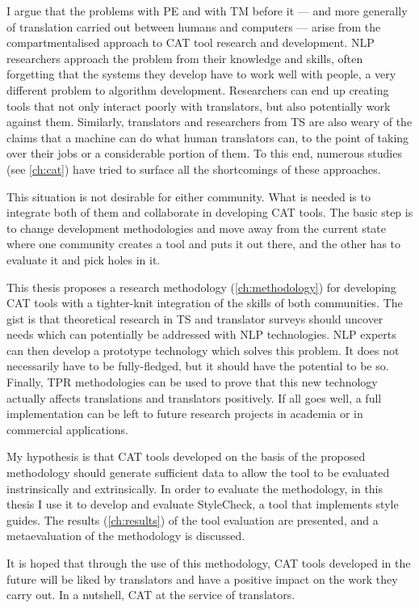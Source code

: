 I argue that the problems with \ac{PE} and with \ac{TM} before it --- and more generally of translation carried out between humans and computers --- arise from the compartmentalised approach to \ac{CAT} tool research and development. \ac{NLP} researchers approach the problem from their knowledge and skills, often forgetting that the systems they develop have to work well with people, a very different problem to algorithm development. Researchers can end up creating tools that not only interact poorly with translators, but also potentially work against them. Similarly, translators and researchers from \ac{TS} are also weary of the claims that a machine can do what human translators can, to the point of taking over their jobs or a considerable portion of them. To this end, numerous studies (see \autoref{ch:cat}) have tried to surface all the shortcomings of these approaches. 

This situation is not desirable for either community. What is needed is to integrate both of them and collaborate in developing \ac{CAT} tools. The basic step is to change development methodologies and move away from the current state where one community creates a tool and puts it out there, and the other has to evaluate it and pick holes in it.

This thesis proposes a research methodology (\autoref{ch:methodology}) for developing \ac{CAT} tools with a tighter-knit integration of the skills of both communities. The gist is that theoretical research in \ac{TS} and translator surveys should uncover needs which can potentially be addressed with \ac{NLP} technologies. \ac{NLP} experts can then develop a prototype technology which solves this problem. It does not necessarily have to be fully-fledged, but it should have the potential to be so. Finally, \ac{TPR} methodologies can be used to prove that this new technology actually affects translations and translators positively. If all goes well, a full implementation can be left to future research projects in academia or in commercial applications.

My hypothesis is that \ac{CAT} tools developed on the basis of the proposed methodology should generate sufficient data to allow the tool to be evaluated instrinsically and extrinsically. In order to evaluate the methodology, in this thesis I use it to develop and evaluate StyleCheck, a tool that implements style guides. The results (\autoref{ch:results}) of the tool evaluation are presented, and a metaevaluation of the methodology is discussed.

It is hoped that through the use of this methodology, \ac{CAT} tools developed in the future will be liked by translators and have a positive impact on the work they carry out. In a nutshell, \ac{CAT} at the service of translators.
